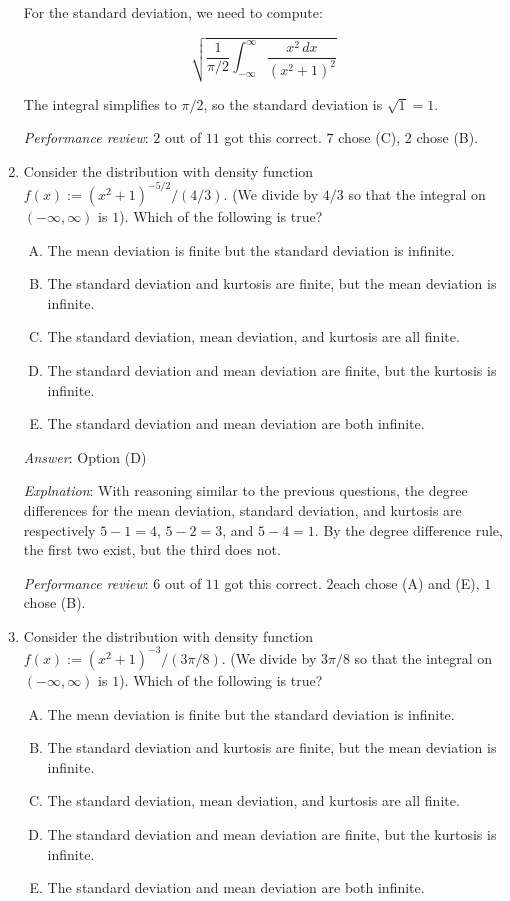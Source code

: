 \documentclass[10pt]{amsart}
\begin{document}
\begin{enumerate}
  For the standard deviation, we need to compute:

  $$\sqrt{\frac{1}{\pi/2}\int_{-\infty}^\infty \frac{x^2 \, dx}{(x^2 + 1)^2}}$$

  The integral simplifies to $\pi/2$, so the standard deviation is
  $\sqrt{1} = 1$.

  {\em Performance review}: $2$ out of $11$ got this correct. $7$
  chose (C), $2$ chose (B).
\item Consider the distribution with density function $f(x):=
  (x^2+1)^{-5/2}/(4/3)$. (We divide by $4/3$ so that the integral on
  $(-\infty,\infty)$ is $1$). Which of the following is true?

  \begin{enumerate}[(A)]
  \item The mean deviation is finite but the standard deviation is infinite.
  \item The standard deviation and kurtosis are finite, but the mean deviation is infinite.
  \item The standard deviation, mean deviation, and kurtosis are all finite.
  \item The standard deviation and mean deviation are finite, but the kurtosis is infinite.
  \item The standard deviation and mean deviation are both infinite.
  \end{enumerate}

  {\em Answer}: Option (D)

  {\em Explnation}: With reasoning similar to the previous questions,
  the degree differences for the mean deviation, standard deviation,
  and kurtosis are respectively $5 - 1 = 4$, $5 - 2 = 3$, and $5 - 4 =
  1$. By the degree difference rule, the first two exist, but the
  third does not.

  {\em Performance review}: $6$ out of $11$ got this correct. $2$each
  chose (A) and (E), $1$ chose (B).

\item Consider the distribution with density function $f(x):=
  (x^2+1)^{-3}/(3\pi/8)$. (We divide by $3\pi/8$ so that the integral on
  $(-\infty,\infty)$ is $1$). Which of the following is true?

  \begin{enumerate}[(A)]
  \item The mean deviation is finite but the standard deviation is infinite.
  \item The standard deviation and kurtosis are finite, but the mean deviation is infinite.
  \item The standard deviation, mean deviation, and kurtosis are all finite.
  \item The standard deviation and mean deviation are finite, but the kurtosis is infinite.
  \item The standard deviation and mean deviation are both infinite.
  \end{enumerate}


\end{enumerate}
\end{document}
